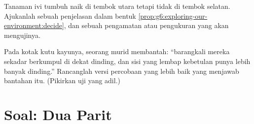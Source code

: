 \begin{exercise}[$\star\star$]\label{exo:g6:exploring-our-environment:11}
Tanaman ivi tumbuh naik di tembok utara tetapi tidak di tembok
selatan. Ajukanlah sebuah penjelasan dalam bentuk
\cref{prop:g6:exploring-our-environment:decide}, dan sebuah pengamatan
atau pengukuran yang akan mengujinya.
\end{exercise}

\begin{exercise}[$\star\star\star$]\label{exo:g6:exploring-our-environment:12}
Pada kotak kutu kayunya, seorang murid membantah: ``barangkali mereka
sekadar berkumpul di dekat dinding, dan sisi yang lembap kebetulan
punya lebih banyak dinding.'' Rancanglah versi percobaan yang lebih
baik yang menjawab bantahan itu. (Pikirkan uji yang adil.)
\end{exercise}

\section{Soal: Dua Parit}

